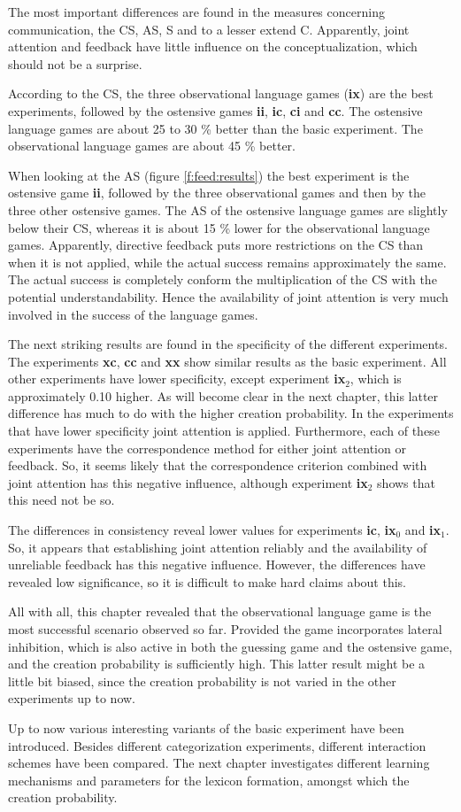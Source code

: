 The most important differences are found in the measures concerning communication, the CS, AS, S and to a lesser extend C. Apparently, joint attention and feedback have little influence on the conceptualization, which should not be a surprise. 

According to the CS, the three observational language games ({\bf ix}) are the best experiments, followed by the ostensive games {\bf ii}, {\bf ic}, {\bf ci} and {\bf cc}. The ostensive language games are about 25 to 30 \% better than the basic experiment. The observational language games are about 45 \% better. 

When looking at the AS (figure \ref{f:feed:results}) the best experiment is the ostensive game {\bf ii}, followed by the three observational games and then by the three other ostensive games. The AS of the ostensive language games are slightly below their CS, whereas it is about 15 \% lower for the observational language games. Apparently, directive feedback puts more restrictions on the CS than when it is not applied, while the actual success remains approximately the same. The actual success is completely conform the multiplication of the CS with the potential understandability. Hence the availability of joint attention is very much involved in the success of the language games. 

The next striking results are found in the specificity of the different experiments. The experiments {\bf xc}, {\bf cc} and {\bf xx} show similar results as the basic experiment. All other experiments have lower specificity, except experiment {\bf ix$_2$}, which is approximately 0.10 higher. As will become clear in the next chapter, this latter difference has much to do with the higher creation probability. In the experiments that have lower specificity joint attention is applied. Furthermore, each of these experiments have the correspondence method for either joint attention or feedback. So, it seems likely that the correspondence criterion combined with joint attention has this negative influence, although experiment {\bf ix$_2$} shows that this need not be so.

The differences in consistency reveal lower values for experiments {\bf ic}, {\bf ix$_0$} and {\bf ix$_1$}. So, it appears that establishing joint attention reliably and the availability of unreliable feedback has this negative influence. However, the differences have revealed low significance, so it is difficult to make hard claims about this.

\p
All with all, this chapter revealed that the observational language game is the most successful scenario observed so far. Provided the game incorporates lateral inhibition, which is also active in both the guessing game and the ostensive game, and the creation probability is sufficiently high. This latter result might be a little bit biased, since the creation probability is not varied in the other experiments up to now.

Up to now various interesting variants of the basic experiment have been introduced. Besides different categorization experiments, different interaction schemes have been compared. The next chapter investigates different learning mechanisms and parameters for the lexicon formation, amongst which the creation probability.
